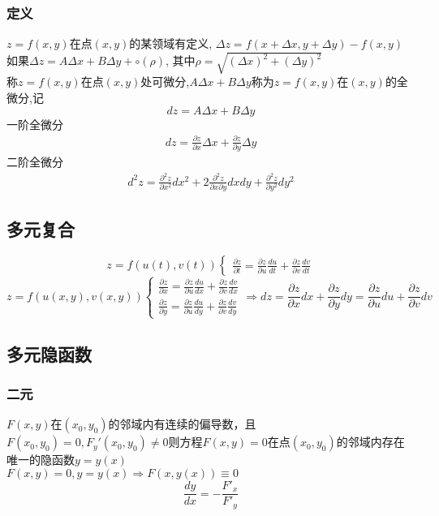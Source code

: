 \subsubsection{定义}
$z=f(x,y)$\mbox{在点}$(x,y)$\mbox{的某领域有定义},
$\Delta z=f(x+\Delta x,y+\Delta y)-f(x,y)$\\
如果$\Delta z=A\Delta x+B\Delta y+\circ(\rho)$,
其中$\rho=\sqrt{(\Delta x)^2+(\Delta y)^2}$\\
称$z=f(x,y)$在点$(x,y)$处可微分,$A\Delta x+B\Delta y$称为$z=f(x,y)$在$(x,y)$的全微分,记
$$dz=A\Delta x+B\Delta y$$
一阶全微分
\begin{align}
	dz=\frac{\partial z}{\partial x}\Delta x+\frac{\partial z}{\partial y}\Delta y\label{Total_differential}
\end{align}
二阶全微分
\begin{align}
	d^2z=\frac{\partial^2 z}{\partial x^2}dx^2+2\frac{\partial^2 z}{\partial x\partial y}dxdy+\frac{\partial^2 z}{\partial y^2}dy^2\label{Total_differential}
\end{align}
\subsection{多元复合}
$$z=f(u(t),v(t))\begin{cases}
	\frac{\partial z}{\partial t}=\frac{\partial z}{\partial u}\frac{du}{dt}+\frac{\partial z}{\partial v}\frac{dv}{dt}
\end{cases}$$
$$z=f(u(x,y),v(x,y))\begin{cases}
	\frac{\partial z}{\partial x}=\frac{\partial z}{\partial u}\frac{du}{dx}+\frac{\partial z}{\partial v}\frac{dv}{dx}\\
	\frac{\partial z}{\partial y}=\frac{\partial z}{\partial u}\frac{du}{dy}+\frac{\partial z}{\partial v}\frac{dv}{dy}
\end{cases}\Rightarrow dz=\frac{\partial z}{\partial x}dx+\frac{\partial z}{\partial y}dy=\frac{\partial z}{\partial u}du+\frac{\partial z}{\partial v}dv$$
\subsection{多元隐函数}
\subsubsection{二元}
$F(x,y)$在$(x_0,y_0)$的邻域内有连续的偏导数，且$F(x_0,y_0)=0,F_y'(x_0,y_0)\neq 0$则方程$F(x,y)=0$在点$(x_0,y_0)$的邻域内存在唯一的隐函数$y=y(x)$\\
$F(x,y)=0,y=y(x)\Rightarrow F(x,y(x))\equiv0$
$$\frac{dy}{dx}=-\frac{F'_x}{F'_y}$$
